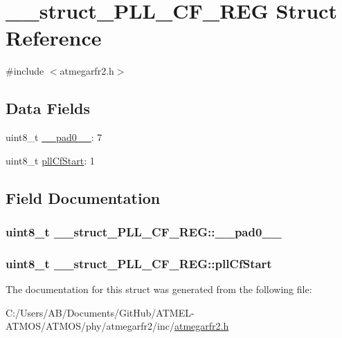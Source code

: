 \hypertarget{struct____struct___p_l_l___c_f___r_e_g}{\section{\-\_\-\-\_\-struct\-\_\-\-P\-L\-L\-\_\-\-C\-F\-\_\-\-R\-E\-G Struct Reference}
\label{struct____struct___p_l_l___c_f___r_e_g}
}


{\ttfamily \#include $<$atmegarfr2.\-h$>$}

\subsection*{Data Fields}
\begin{DoxyCompactItemize}
\item 
uint8\-\_\-t \hyperlink{struct____struct___p_l_l___c_f___r_e_g_af51c3340d9ac37124b0376e9b0167c62}{\-\_\-\-\_\-pad0\-\_\-\-\_\-}\-: 7
\item 
uint8\-\_\-t \hyperlink{struct____struct___p_l_l___c_f___r_e_g_a426893f4b22bdcd9ecc835b075662959}{pll\-Cf\-Start}\-: 1
\end{DoxyCompactItemize}


\subsection{Field Documentation}
\hypertarget{struct____struct___p_l_l___c_f___r_e_g_af51c3340d9ac37124b0376e9b0167c62}{
\subsubsection[{\-\_\-\-\_\-pad0\-\_\-\-\_\-}]{\setlength{\rightskip}{0pt plus 5cm}uint8\-\_\-t \-\_\-\-\_\-struct\-\_\-\-P\-L\-L\-\_\-\-C\-F\-\_\-\-R\-E\-G\-::\-\_\-\-\_\-pad0\-\_\-\-\_\-}}\label{struct____struct___p_l_l___c_f___r_e_g_af51c3340d9ac37124b0376e9b0167c62}
\hypertarget{struct____struct___p_l_l___c_f___r_e_g_a426893f4b22bdcd9ecc835b075662959}{
\subsubsection[{pll\-Cf\-Start}]{\setlength{\rightskip}{0pt plus 5cm}uint8\-\_\-t \-\_\-\-\_\-struct\-\_\-\-P\-L\-L\-\_\-\-C\-F\-\_\-\-R\-E\-G\-::pll\-Cf\-Start}}\label{struct____struct___p_l_l___c_f___r_e_g_a426893f4b22bdcd9ecc835b075662959}


The documentation for this struct was generated from the following file\-:\begin{DoxyCompactItemize}
\item 
C\-:/\-Users/\-A\-B/\-Documents/\-Git\-Hub/\-A\-T\-M\-E\-L-\/\-A\-T\-M\-O\-S/\-A\-T\-M\-O\-S/phy/atmegarfr2/inc/\hyperlink{atmegarfr2_8h}{atmegarfr2.\-h}\end{DoxyCompactItemize}

